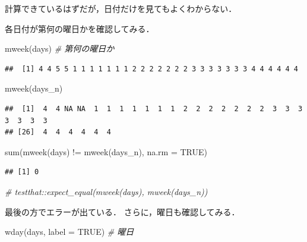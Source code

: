 \documentclass[
]{article}
\newenvironment{Shaded}{\begin{snugshade}}{\end{snugshade}}
\newcommand{\AttributeTok}[1]{\textcolor[rgb]{0.77,0.63,0.00}{#1}}
\newcommand{\CommentTok}[1]{\textcolor[rgb]{0.56,0.35,0.01}{\textit{#1}}}
\newcommand{\ConstantTok}[1]{\textcolor[rgb]{0.00,0.00,0.00}{#1}}
\newcommand{\FunctionTok}[1]{\textcolor[rgb]{0.00,0.00,0.00}{#1}}
\newcommand{\NormalTok}[1]{#1}
\newcommand{\SpecialCharTok}[1]{\textcolor[rgb]{0.00,0.00,0.00}{#1}}
\begin{document}
計算できているはずだが，日付だけを見てもよくわからない．

各日付が第何の曜日かを確認してみる．

\begin{Shaded}
\begin{Highlighting}[]
\FunctionTok{mweek}\NormalTok{(days)   }\CommentTok{\# 第何の曜日か}
\end{Highlighting}
\end{Shaded}

\begin{verbatim}
##  [1] 4 4 5 5 1 1 1 1 1 1 1 2 2 2 2 2 2 2 3 3 3 3 3 3 3 4 4 4 4 4 4
\end{verbatim}

\begin{Shaded}
\begin{Highlighting}[]
\FunctionTok{mweek}\NormalTok{(days\_n)}
\end{Highlighting}
\end{Shaded}

\begin{verbatim}
##  [1]  4  4 NA NA  1  1  1  1  1  1  1  2  2  2  2  2  2  2  3  3  3  3  3  3  3
## [26]  4  4  4  4  4  4
\end{verbatim}

\begin{Shaded}
\begin{Highlighting}[]
\FunctionTok{sum}\NormalTok{(}\FunctionTok{mweek}\NormalTok{(days) }\SpecialCharTok{!=} \FunctionTok{mweek}\NormalTok{(days\_n), }\AttributeTok{na.rm =} \ConstantTok{TRUE}\NormalTok{)}
\end{Highlighting}
\end{Shaded}

\begin{verbatim}
## [1] 0
\end{verbatim}

\begin{Shaded}
\begin{Highlighting}[]
  \CommentTok{\# testthat::expect\_equal(mweek(days), mweek(days\_n))}
\end{Highlighting}
\end{Shaded}

最後の方でエラーが出ている．
さらに，曜日も確認してみる．

\begin{Shaded}
\begin{Highlighting}[]
\FunctionTok{wday}\NormalTok{(days, }\AttributeTok{label =} \ConstantTok{TRUE}\NormalTok{)   }\CommentTok{\# 曜日}
\end{Highlighting}
\end{Shaded}
\end{document}
